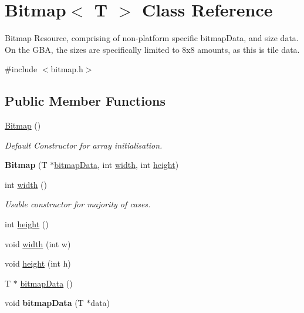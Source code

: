 \hypertarget{class_bitmap_3_01_t_01_4}{\section{Bitmap$<$ T $>$ Class Reference}
\label{class_bitmap_3_01_t_01_4}
}


Bitmap Resource, comprising of non-\/platform specific bitmap\-Data, and size data. On the G\-B\-A, the sizes are specifically limited to 8x8 amounts, as this is tile data.  




{\ttfamily \#include $<$bitmap.\-h$>$}

\subsection*{Public Member Functions}
\begin{DoxyCompactItemize}
\item 
\hypertarget{class_bitmap_3_01_t_01_4_a639b3eb5055babcb2a24c1fc84539cb4}{\hyperlink{class_bitmap_3_01_t_01_4_a639b3eb5055babcb2a24c1fc84539cb4}{Bitmap} ()}\label{class_bitmap_3_01_t_01_4_a639b3eb5055babcb2a24c1fc84539cb4}

\begin{DoxyCompactList}\small\item\em Default Constructor for array initialisation. \end{DoxyCompactList}\item 
\hypertarget{class_bitmap_3_01_t_01_4_a87c905c83a3d6241363d10f32c97b5ac}{{\bfseries Bitmap} (T $\ast$\hyperlink{class_bitmap_3_01_t_01_4_ae6775d0558eb794f625b3353abd52dac}{bitmap\-Data}, int \hyperlink{class_bitmap_3_01_t_01_4_aa9d9619b37ce2339ee1db4c4a3068fcb}{width}, int \hyperlink{class_bitmap_3_01_t_01_4_a08ed36c28aedf05e2cb37cc73fe77022}{height})}\label{class_bitmap_3_01_t_01_4_a87c905c83a3d6241363d10f32c97b5ac}

\item 
int \hyperlink{class_bitmap_3_01_t_01_4_aa9d9619b37ce2339ee1db4c4a3068fcb}{width} ()
\begin{DoxyCompactList}\small\item\em Usable constructor for majority of cases. \end{DoxyCompactList}\item 
int \hyperlink{class_bitmap_3_01_t_01_4_a08ed36c28aedf05e2cb37cc73fe77022}{height} ()
\item 
void \hyperlink{class_bitmap_3_01_t_01_4_a1b469bd5c8f4ecc1ada64e67a4892ed1}{width} (int w)
\item 
void \hyperlink{class_bitmap_3_01_t_01_4_ad848451ebb0a8ed1386012e98b6b5374}{height} (int h)
\item 
T $\ast$ \hyperlink{class_bitmap_3_01_t_01_4_ae6775d0558eb794f625b3353abd52dac}{bitmap\-Data} ()
\item 
\hypertarget{class_bitmap_3_01_t_01_4_a0b930d95addaa750b52efb8cc308de81}{void {\bfseries bitmap\-Data} (T $\ast$data)}\label{class_bitmap_3_01_t_01_4_a0b930d95addaa750b52efb8cc308de81}

\end{DoxyCompactItemize}


